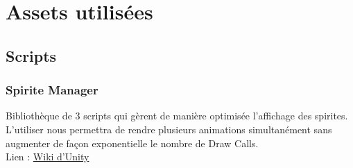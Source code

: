 \section{Assets utilisées}
\subsection{Scripts}
\subsubsection{Spirite Manager}
Bibliothèque de 3 scripts qui gèrent de manière optimisée l'affichage des spirites.
L'utiliser nous permettra de rendre plusieurs animations simultanément sans augmenter de façon exponentielle le nombre de Draw Calls.\\

Lien : \href{http://wiki.unity3d.com/index.php?title=SpriteManager}{Wiki d'Unity}
